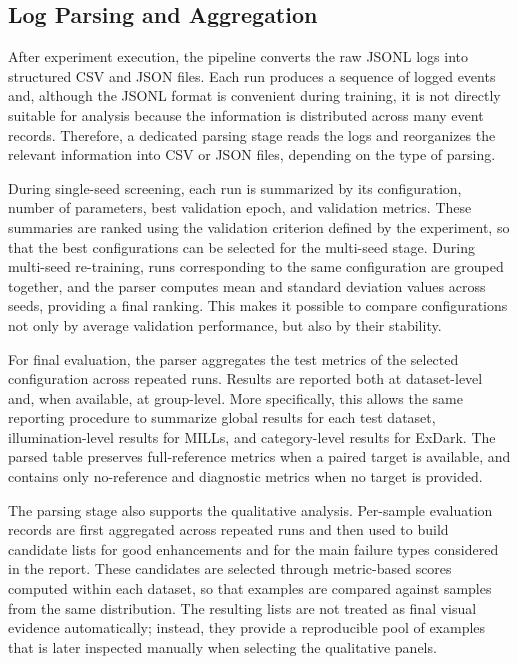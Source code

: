 \subsection{Log Parsing and Aggregation}

After experiment execution, the pipeline converts the raw JSONL logs into structured CSV and JSON files. Each run produces a sequence of logged events and, although the JSONL format is convenient during training, it is not directly suitable for analysis because the information is distributed across many event records. Therefore, a dedicated parsing stage reads the logs and reorganizes the relevant information into CSV or JSON files, depending on the type of parsing.

During single-seed screening, each run is summarized by its configuration, number of parameters, best validation epoch, and validation metrics. These summaries are ranked using the validation criterion defined by the experiment, so that the best configurations can be selected for the multi-seed stage. During multi-seed re-training, runs corresponding to the same configuration are grouped together, and the parser computes mean and standard deviation values across seeds, providing a final ranking. This makes it possible to compare configurations not only by average validation performance, but also by their stability.

For final evaluation, the parser aggregates the test metrics of the selected configuration across repeated runs. Results are reported both at dataset-level and, when available, at group-level. More specifically, this allows the same reporting procedure to summarize global results for each test dataset, illumination-level results for MILLs, and category-level results for ExDark. The parsed table preserves full-reference metrics when a paired target is available, and contains only no-reference and diagnostic metrics when no target is provided.

The parsing stage also supports the qualitative analysis. Per-sample evaluation records are first aggregated across repeated runs and then used to build candidate lists for good enhancements and for the main failure types considered in the report. These candidates are selected through metric-based scores computed within each dataset, so that examples are compared against samples from the same distribution. The resulting lists are not treated as final visual evidence automatically; instead, they provide a reproducible pool of examples that is later inspected manually when selecting the qualitative panels.

